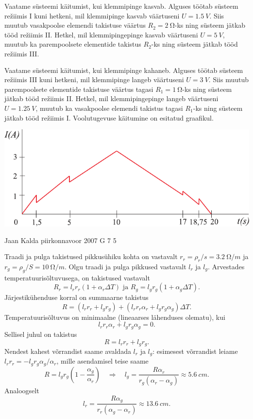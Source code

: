 \documentclass[11pt, twoside]{article}
\begin{document}
{{Vaatame süsteemi käitumist, kui klemmipinge kasvab. Alguses töötab süsteem režiimis I kuni hetkeni, mil klemmipinge kasvab väärtuseni $U = \SI{1,5}{V}$. Siis muutub vasakpoolse elemendi takistuse väärtus $R_2 = \SI{2}{\ohm}$-ks ning süsteem jätkab tööd režiimis II. Hetkel, mil klemmipingepinge kasvab väärtuseni $U = \SI{5}{V}$, muutub ka parempoolsete elementide takistus $R_2$-ks ning süsteem jätkab tööd režiimis III.

Vaatame süsteemi käitumist, kui klemmipinge kahaneb. Alguses töötab süsteem režiimis III kuni hetkeni, mil klemmipinge langeb väärtuseni $U = \SI{3}{V}$. Siis muutub parempoolsete elementide takistuse väärtus tagasi $R_1 = \SI{1}{\ohm}$-ks ning süsteem jätkab tööd režiimis II. Hetkel, mil klemmipingepinge langeb väärtuseni $U = \SI{1,25}{V}$, muutub ka vasakpoolse elemendi takistus tagasi $R_1$-ks ning süsteem jätkab tööd režiimis I. Voolutugevuse käitumine on esitatud graafikul.

\begin{center}
	\includegraphics[width=0.9\linewidth]{2009-lahg-03-lah}
\end{center}
\fi
}

{Jaan Kalda} %
{piirkonnavoor} %
{2007} %
{G 7} %
{5} %
{

\ifSolution
Traadi ja pulga takistused pikkusühiku kohta on vastavalt $r_r = \rho_r/s = \SI{3,2}{\ohm/m}$ ja $r_g = \rho_g/S = \SI{10}{\ohm/m}$. Olgu traadi ja pulga pikkused vastavalt $l_r$ ja $l_g$. Arvestades temperatuurisõltuvusega, on takistused vastavalt
\[
R_{r}=l_{r} r_{r}\left(1+\alpha_{r} \Delta T\right) \text { ja } R_{g}=l_{g} r_{g}\left(1+\alpha_{g} \Delta T\right).
\]
Järjestikühenduse korral on summaarne takistus
\[
R=\left(l_{r} r_{r}+l_{g} r_{g}\right)+\left(l_{r} r_{r} \alpha_{r}+l_{g} r_{g} \alpha_{g}\right) \Delta T.
\]
Temperatuurisõltuvus on minimaalne (lineaarses lähenduses olematu), kui
\[
l_{r} r_{r} \alpha_{r}+l_{g} r_{g} \alpha_{g}=0.
\]
Sellisel juhul on takistus
\[
R=l_{r} r_{r}+l_{g} r_{g}.
\]
Nendest kahest võrrandist saame avaldada $l_r$ ja $l_g$: esimesest võrrandist leiame $l_rr_r = -l_gr_g\alpha_g/\alpha_r$, mille asendamisel teise saame
\[
R=l_{g} r_{g}\left(1-\frac{\alpha_{g}}{\alpha_{r}}\right) \quad \Rightarrow \quad l_{g}=\frac{R \alpha_{r}}{r_{g}\left(\alpha_{r}-\alpha_{g}\right)} \approx \SI{5,6}{cm}.
\]
Analoogselt
\[
l_{r}=\frac{R \alpha_{g}}{r_{r}\left(\alpha_{g}-\alpha_{r}\right)} \approx \SI{13,6}{cm}.
\]
\fi
}

}
\end{document}
